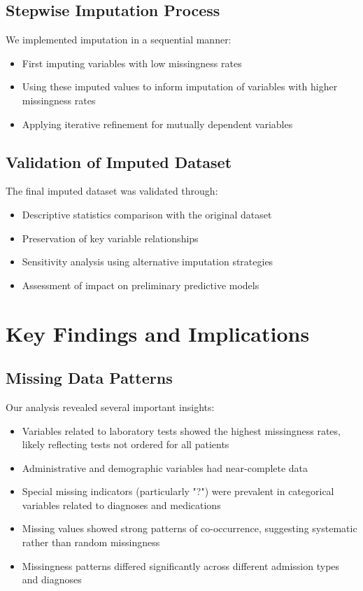 \subsection{Stepwise Imputation Process}
We implemented imputation in a sequential manner:
\begin{itemize}
    \item First imputing variables with low missingness rates
    \item Using these imputed values to inform imputation of variables with higher missingness rates
    \item Applying iterative refinement for mutually dependent variables
\end{itemize}

\subsection{Validation of Imputed Dataset}
The final imputed dataset was validated through:
\begin{itemize}
    \item Descriptive statistics comparison with the original dataset
    \item Preservation of key variable relationships
    \item Sensitivity analysis using alternative imputation strategies
    \item Assessment of impact on preliminary predictive models
\end{itemize}

\section{Key Findings and Implications}
\label{sec:findings}

\subsection{Missing Data Patterns}
Our analysis revealed several important insights:
\begin{itemize}
    \item Variables related to laboratory tests showed the highest missingness rates, likely reflecting tests not ordered for all patients
    \item Administrative and demographic variables had near-complete data
    \item Special missing indicators (particularly "?") were prevalent in categorical variables related to diagnoses and medications
    \item Missing values showed strong patterns of co-occurrence, suggesting systematic rather than random missingness
    \item Missingness patterns differed significantly across different admission types and diagnoses
\end{itemize}

